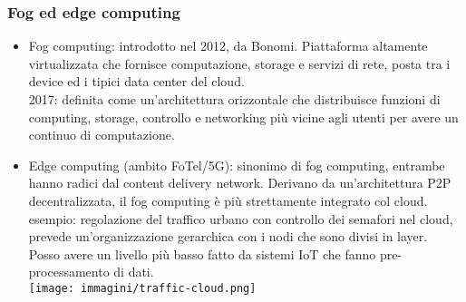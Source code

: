 \documentclass{article}
\begin{document}
\subsubsection{Fog ed edge computing}
\begin{itemize}
\item Fog computing: introdotto nel 2012, da Bonomi. Piattaforma altamente virtualizzata che fornisce computazione, storage e servizi di rete, posta tra i device ed i tipici data center del cloud.\\2017: definita come un'architettura orizzontale che distribuisce funzioni di computing, storage, controllo e networking più vicine agli utenti per avere un continuo di computazione.
\item Edge computing (ambito FoTel/5G): sinonimo di fog computing, entrambe hanno radici dal content delivery network. Derivano da un'architettura P2P decentralizzata, il fog computing è più strettamente integrato col cloud.
esempio: regolazione del traffico urbano con controllo dei semafori nel cloud, prevede un'organizzazione gerarchica con i nodi che sono divisi in layer.\\ Posso avere un livello più basso fatto da sistemi IoT che fanno pre-processamento di dati.\\
\texttt{[image: immagini/traffic-cloud.png]}
\end{itemize}
\end{document}
